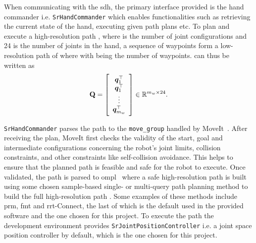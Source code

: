 When communicating with the \gls{sdh}, the primary interface provided is the hand commander i.e. \texttt{SrHandCommander} which enables functionalities such as retrieving the current state of the hand, executing given path plans etc. To plan and execute a high-resolution path , where  is the number of joint configurations and \num{24} is the number of joints in the hand, a sequence of waypoints  form a low-resolution path of  where  with  being the number of waypoints.  can thus be written as
\begin{equation}\label{eq:waypoint-path-matrix}
	\bm{\mathrm{Q}} = 
		\left[\begin{array}{ccc}
			\bm{q}_1^\top \\
			\bm{q}_1^\top \\
			\vdots \\
			\bm{q}_{m_w}^\top
		\end{array}\right] \in\mathbb{R}^{m_w \times 24}.
\end{equation}

\texttt{SrHandCommander} parses the path to the \texttt{move\_group} handled by MoveIt~\cite{reducing-the-barrier-to-entry-of-complex-robotic-software:-a-moveit!-case-study}. After receiving the plan, MoveIt first checks the validity of the start, goal and intermediate configurations concerning the robot's joint limits, collision constraints, and other constraints like self-collision avoidance. This helps to ensure that the planned path is feasible and safe for the robot to execute. Once validated, the path  is parsed to \gls{ompl}~\cite{the-open-motion-planning-library} where a safe high-resolution path is built using some chosen sample-based single- or multi-query path planning method to build the full high-resolution path . Some examples of these methods include \gls{prm}, \gls{fmt} and \gls{rrt}-Connect, the last of which is the default used in the provided software and the one chosen for this project. To execute the path the development environment provides \texttt{SrJointPositionController} i.e. a joint space position controller by default, which is the one chosen for this project. \medskip

